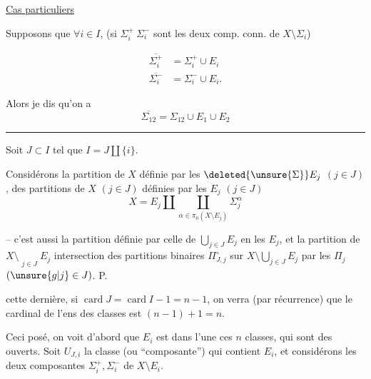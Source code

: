 
\uline{Cas particuliers}

Supposons que $\forall i\in I$,   (si $\Sigma_i^+\ \Sigma_i^-$ sont les deux comp. conn. de $X\setminus\Sigma_i$)

\[
\begin{aligned}
\overline{\Sigma_i^+} &= \Sigma_i^+\cup E_i\\
\overline{\Sigma_i^-} &= \Sigma_i^-\cup E_i .
\end{aligned}
\]

Alors je dis qu'on a
\[
\overline{\Sigma_{12}}=\Sigma_{12}\cup E_1\cup E_2
\]

\noindent\rule{2.4cm}{0.3pt}\par

\reversemarginpar
{}
\normalmarginpar
{}

Soit $J\subset I$ tel que $I=J\amalg\{i\}$.

Considérons la partition  de $X$  définie par les $\deleted{\unsure{\Sigma}}E_j$ $(j\in J)$,   des partitions  de $X$ $(j\in J)$ définies par les $E_j$  $(j\in J)$
\[
X=E_j\amalg\coprod_{\alpha\in\pi_0(X\setminus E_j)}\Sigma_j^\alpha
\]

-- c'est aussi la partition définie par celle de $\displaystyle\bigcup_{j\in J}E_j$ en les $E_j$, et la partition  de $\displaystyle X\setminus\mathop{\overline{\bigcup}}\limits_{j\in J}E_j$ intersection des partitions binaires $\Pi_{J,j}^{\circ}$   sur  $\displaystyle X\setminus\bigcup_{j\in J}E_j$ par les $\Pi_j$ $(\unsure{g|j}\in J)$. P. 

cette dernière, si $\operatorname{card}J=\operatorname{card}I-1=n-1$, on verra (par récurrence) que le cardinal de l'ens des classes est $(n-1)+1=n$.

Ceci posé, on voit d'abord que $E_i$ est dans l'une   ces $n$ classes, qui sont des ouverts. Soit $U_{J,i}$ la classe (ou ``composante'') qui contient $E_i$, et considérons les deux composantes $\Sigma_i^+,\Sigma_i^-$ de $X\setminus E_i$.

